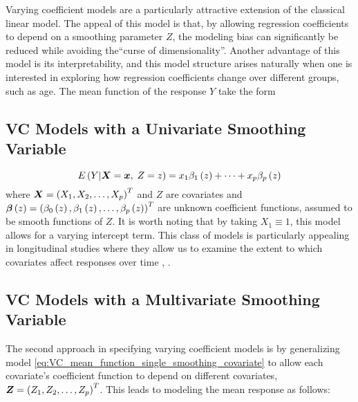 \documentclass[12pt]{article}
\newcommand*\outlineskeleton{\color{green}}
\newcommand{\bfbeta}{\mbox{\boldmath $\beta$}}
\newcommand{\bfx}{\mbox{\boldmath $x$}}
\newcommand{\bfX}{\mbox{\boldmath $X$}}
\newcommand{\bfZ}{\mbox{\boldmath $Z$}}
\begin{document}
Varying coefficient models are a particularly attractive extension of the classical linear model. The appeal of this model is that, by allowing regression coefficients to depend on a smoothing parameter $Z$, the modeling bias can significantly be reduced while avoiding the``curse of dimensionality''. Another advantage of this model is its interpretability, and this model structure arises naturally when one is interested in exploring how regression coefficients change over different groups, such as age. The mean function of the response $Y$ take the form

\subsection{{\outlineskeleton VC Models with a Univariate Smoothing Variable}} \label{univariate_VC_models}

\begin{equation} \label{eq:VC_mean_function_single_smoothing_covariate}
E\left(Y \vert \bfX=\bfx,\;Z = z \right) = x_1\beta_1\left(z\right) + \dots  + x_p\beta_p\left(z\right)
\end{equation}
\noindent
where $\bfX = \left(X_1, X_2, \dots, X_p\right)^T$ and $Z$ are covariates and $\bfbeta\left(z\right) = \left( \beta_0\left(z\right), \beta_1\left(z\right),\dots,\beta_p\left(z\right) \right)^T$ are unknown coefficient functions, assumed to be smooth functions of $Z$. It is worth noting that by taking $X_1 \equiv 1$, this model allows for a varying intercept term. This class of models is particularly appealing in longitudinal studies where they allow us to examine the extent to which covariates affect responses over time \cite{hoover1998nonparametric}, \cite{fan2000two}. 

\subsection{{\outlineskeleton VC Models with a Multivariate Smoothing Variable}} \label{multivariate_VC_models}

The second approach in specifying varying coefficient models is by generalizing model \ref{eq:VC_mean_function_single_smoothing_covariate} to allow each covariate's coefficient function to depend on different covariates, $\bfZ = \left(Z_1, Z_2, \dots, Z_p\right)^T$. This leads to modeling the mean response as follows:
\end{document}
